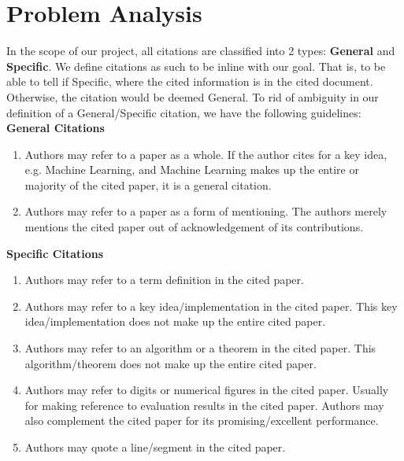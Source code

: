 \chapter{Problem Analysis}
\label{problemanalysis}

In the scope of our project, all citations are classified into 2 types: \textbf{General} and \textbf{Specific}. We define citations as such to be inline with our goal. That is, to be able to tell if Specific, where the cited information is in the cited document. Otherwise, the citation would be deemed General. To rid of ambiguity in our definition of a General/Specific citation, we have the following guidelines:\\
\textbf{General Citations}
\begin{enumerate}
\item Authors may refer to a paper as a whole. If the author cites for a key idea, e.g. Machine Learning, and Machine Learning makes up the entire or majority of the cited paper, it is a general citation.
\item Authors may refer to a paper as a form of mentioning. The authors merely mentions the cited paper out of acknowledgement of its contributions.
\end{enumerate}
\textbf{Specific Citations}
\begin{enumerate}
\item Authors may refer to a term definition in the cited paper.
\item Authors may refer to a key idea/implementation in the cited paper. This key idea/implementation does not make up the entire cited paper.
\item Authors may refer to an algorithm or a theorem in the cited paper. This algorithm/theorem does not make up the entire cited paper.
\item Authors may refer to digits or numerical figures in the cited paper. Usually for making reference to evaluation results in the cited paper. Authors may also complement the cited paper for its promising/excellent performance.
\item Authors may quote a line/segment in the cited paper.
\end{enumerate}

